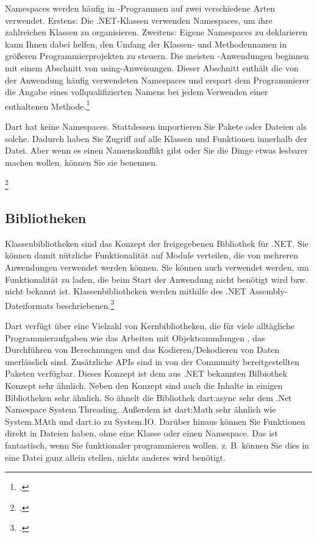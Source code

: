 Namespaces werden häufig in \Csharp -Programmen auf zwei verschiedene Arten verwendet. Erstens: Die .NET-Klassen verwenden Namespaces, um ihre zahlreichen Klassen zu organisieren. Zweitens: Eigene Namespaces zu deklarieren kann Ihnen dabei helfen, den Umfang der Klassen- und Methodennamen in größeren Programmierprojekten zu steuern.
Die meisten \Csharp -Anwendungen beginnen mit einem Abschnitt von using-Anweisungen. Dieser Abschnitt enthält die von der Anwendung häufig verwendeten Namespaces und erspart dem Programmierer die Angabe eines vollqualifizierten Namens bei jedem Verwenden einer enthaltenen Methode.\footcite[Vgl.  Verwenden von Namespaces (\Csharp-Programmierhandbuch)][Abgerufen am \today]{GoogleFlutterSharedPreferences2020} 



Dart hat keine Namespaces. Stattdessen importieren Sie Pakete oder Dateien als solche.
Dadurch haben Sie Zugriff auf alle Klassen und Funktionen innerhalb der Datei. Aber wenn es einen Namenskonflikt gibt oder Sie die Dinge etwas lesbarer machen wollen, können Sie sie benennen.

\begin{minipage}{\linewidth}

\end{minipage}
\footcitetext[In Anlehnung an ][Abgerufen am \today]{Pedley2019}

\subsection{Bibliotheken}

Klassenbibliotheken sind das Konzept der freigegebenen Bibliothek für .NET. Sie können damit nützliche Funktionalität auf Module verteilen, die von mehreren Anwendungen verwendet werden können. Sie können auch verwendet werden, um Funktionalität zu laden, die beim Start der Anwendung nicht benötigt wird bzw. nicht bekannt ist. Klassenbibliotheken werden mithilfe des .NET Assembly-Dateiformats beschriebenen.\footcite[Vgl. .NET-Klassenbibliotheken
][Abgerufen am \today]{GoogleFlutterSharedPreferences2020} 

Dart verfügt über eine Vielzahl von Kernbibliotheken, die für viele alltägliche Programmieraufgaben wie das Arbeiten mit Objektsammlungen , das Durchführen von Berechnungen und das Kodieren/Dekodieren von Daten  unerlässlich sind.  Zusätzliche APIs sind in von der Community bereitgestellten Paketen verfügbar. Dieses Konzept ist dem aus .NET bekannten Bilbiothek Konzept sehr ähnlich.
Neben den Konzept sind auch die Inhalte in einigen Bibliotheken sehr ähnlich. So ähnelt die Bibliothek dart:async sehr dem .Net Namespace System.Threading.  Außerdem ist dart:Math sehr ähnlich wie System.MAth und dart.io zu System.IO.
Darüber hinaus können Sie Funktionen direkt in Dateien haben, ohne eine Klasse oder einen Namespace. Das ist fantastisch, wenn Sie funktionaler programmieren wollen. z. B. können Sie dies in eine Datei ganz allein stellen, nichts anderes wird benötigt.


